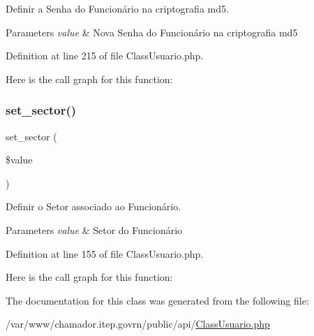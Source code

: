 Definir a Senha do Funcionário na criptografia md5. 


\begin{DoxyParams}{Parameters}
{\em value} & Nova Senha do Funcionário na criptografia md5 \\
\hline
\end{DoxyParams}


Definition at line 215 of file Class\+Usuario.\+php.

Here is the call graph for this function\+:
\mbox{\label{class_class_usuario_a0d66a3911f396de6d492ac322bf5569d}} 
\subsubsection{\texorpdfstring{set\+\_\+sector()}{set\_sector()}}
{\footnotesize\ttfamily set\+\_\+sector (\begin{DoxyParamCaption}\item[{}]{\$value }\end{DoxyParamCaption})}



Definir o Setor associado ao Funcionário. 


\begin{DoxyParams}{Parameters}
{\em value} & Setor do Funcionário \\
\hline
\end{DoxyParams}


Definition at line 155 of file Class\+Usuario.\+php.

Here is the call graph for this function\+:


The documentation for this class was generated from the following file\+:\begin{DoxyCompactItemize}
\item 
/var/www/chamador.\+itep.\+govrn/public/api/\hyperlink{_class_usuario_8php}{Class\+Usuario.\+php}\end{DoxyCompactItemize}
